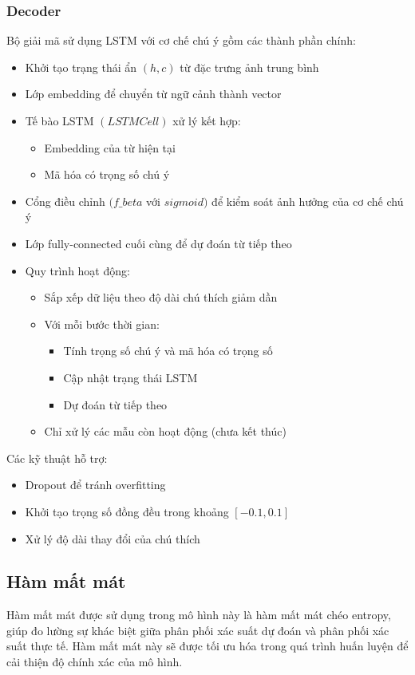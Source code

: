 \documentclass[conference]{IEEEtran}
\begin{document}
\subsubsection{Decoder}
Bộ giải mã sử dụng LSTM với cơ chế chú ý gồm các thành phần chính:
\begin{itemize}
    \item Khởi tạo trạng thái ẩn $(h, c)$ từ đặc trưng ảnh trung bình
    \item Lớp embedding để chuyển từ ngữ cảnh thành vector
    \item Tế bào LSTM $(LSTMCell)$ xử lý kết hợp:
    \begin{itemize}
        \item Embedding của từ hiện tại
        \item Mã hóa có trọng số chú ý
    \end{itemize}
    \item Cổng điều chỉnh $(f\_beta$ với $sigmoid)$ để kiểm soát ảnh hưởng của cơ chế chú ý
    \item Lớp fully-connected cuối cùng để dự đoán từ tiếp theo
    \item Quy trình hoạt động:
    \begin{itemize}
        \item Sắp xếp dữ liệu theo độ dài chú thích giảm dần
        \item Với mỗi bước thời gian:
        \begin{itemize}
            \item Tính trọng số chú ý và mã hóa có trọng số
            \item Cập nhật trạng thái LSTM
            \item Dự đoán từ tiếp theo
        \end{itemize}
        \item Chỉ xử lý các mẫu còn hoạt động (chưa kết thúc)
    \end{itemize}
\end{itemize}

Các kỹ thuật hỗ trợ:
\begin{itemize}
    \item Dropout để tránh overfitting
    \item Khởi tạo trọng số đồng đều trong khoảng $[-0.1, 0.1]$
    \item Xử lý độ dài thay đổi của chú thích
\end{itemize}
\subsection{Hàm mất mát}
Hàm mất mát được sử dụng trong mô hình này là hàm mất mát chéo entropy, giúp đo lường sự khác biệt giữa phân phối xác suất dự đoán và phân phối xác suất thực tế. Hàm mất mát này sẽ được tối ưu hóa trong quá trình huấn luyện để cải thiện độ chính xác của mô hình.
\end{document}
